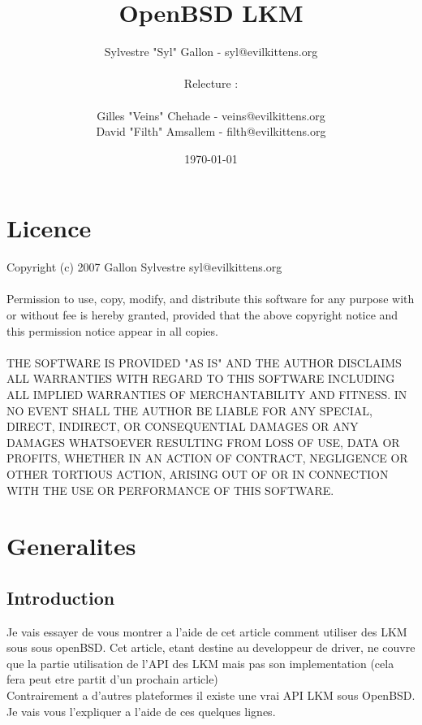 \documentclass[a4paper, 11pt]{article}
\title{OpenBSD LKM}
\author{Sylvestre "Syl" Gallon - syl@evilkittens.org\\\\ Relecture : \\\\ Gilles "Veins" Chehade - veins@evilkittens.org \\ David "Filth" Amsallem - filth@evilkittens.org}
\date{\today}
\begin{document}
\maketitle
\newpage
\tableofcontents
\newpage
\section{Licence}
Copyright (c) 2007 Gallon Sylvestre syl@evilkittens.org
\\\\
Permission to use, copy, modify, and distribute this software for any
purpose with or without fee is hereby granted, provided that the above
copyright notice and this permission notice appear in all copies.
\\\\
THE SOFTWARE IS PROVIDED "AS IS" AND THE AUTHOR DISCLAIMS ALL WARRANTIES
WITH REGARD TO THIS SOFTWARE INCLUDING ALL IMPLIED WARRANTIES OF
MERCHANTABILITY AND FITNESS. IN NO EVENT SHALL THE AUTHOR BE LIABLE FOR
ANY SPECIAL, DIRECT, INDIRECT, OR CONSEQUENTIAL DAMAGES OR ANY DAMAGES
WHATSOEVER RESULTING FROM LOSS OF USE, DATA OR PROFITS, WHETHER IN AN
ACTION OF CONTRACT, NEGLIGENCE OR OTHER TORTIOUS ACTION, ARISING OUT OF
OR IN CONNECTION WITH THE USE OR PERFORMANCE OF THIS SOFTWARE.

\newpage
\section{Generalites}
\subsection{Introduction}
Je vais essayer de vous montrer a l'aide de cet article comment utiliser des
LKM sous sous openBSD. Cet article, etant destine au developpeur de driver, ne couvre
que la partie utilisation de l'API des LKM mais pas son implementation (cela fera
peut etre partit d'un prochain article)\\

Contrairement a d'autres plateformes il existe une vrai API LKM sous OpenBSD.
Je vais vous l'expliquer a l'aide de ces quelques lignes.
\end{document}
